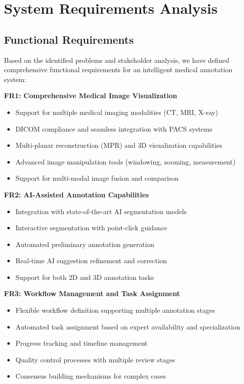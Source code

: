 \section{System Requirements Analysis}

\subsection{Functional Requirements}

Based on the identified problems and stakeholder analysis, we have defined comprehensive functional requirements for an intelligent medical annotation system:

\textbf{FR1: Comprehensive Medical Image Visualization}
\begin{itemize}
    \item Support for multiple medical imaging modalities (CT, MRI, X-ray)
    \item DICOM compliance and seamless integration with PACS systems
    \item Multi-planar reconstruction (MPR) and 3D visualization capabilities
    \item Advanced image manipulation tools (windowing, zooming, measurement)
    \item Support for multi-modal image fusion and comparison
\end{itemize}

\textbf{FR2: AI-Assisted Annotation Capabilities}
\begin{itemize}
    \item Integration with state-of-the-art AI segmentation models
    \item Interactive segmentation with point-click guidance
    \item Automated preliminary annotation generation
    \item Real-time AI suggestion refinement and correction
    \item Support for both 2D and 3D annotation tasks
\end{itemize}

\textbf{FR3: Workflow Management and Task Assignment}
\begin{itemize}
    \item Flexible workflow definition supporting multiple annotation stages
    \item Automated task assignment based on expert availability and specialization
    \item Progress tracking and timeline management
    \item Quality control processes with multiple review stages
    \item Consensus building mechanisms for complex cases
\end{itemize}

